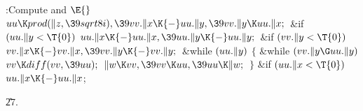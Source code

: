\Y\B\4:Compute  and \X${}\E{}$\6
$\\{uu}\K\\{prod}(\|z,\39\\{sqrt8i}),\39\\{vv}.\|x\K{-}\\{uu}.\|y,\39\\{vv}.\|y%
\K\\{uu}.\|x;{}$\6
\&{if} ${}(\\{uu}.\|y<\T{0}){}$\1\5
${}\\{uu}.\|x\K{-}\\{uu}.\|x,\39\\{uu}.\|y\K{-}\\{uu}.\|y;{}$\2\6
\&{if} ${}(\\{vv}.\|y<\T{0}){}$\1\5
${}\\{vv}.\|x\K{-}\\{vv}.\|x,\39\\{vv}.\|y\K{-}\\{vv}.\|y;{}$\2\6
\&{while} ${}(\\{uu}.\|y){}$\5
${}\{{}$\1\6
\&{while} ${}(\\{vv}.\|y\G\\{uu}.\|y){}$\1\5
${}\\{vv}\K\\{diff}(\\{vv},\39\\{uu});{}$\2\6
${}\|w\K\\{vv},\39\\{vv}\K\\{uu},\39\\{uu}\K\|w;{}$\6
\4${}\}{}$\2\6
\&{if} ${}(\\{uu}.\|x<\T{0}){}$\1\5
${}\\{uu}.\|x\K{-}\\{uu}.\|x{}$;\2\par
\U27.\fi

